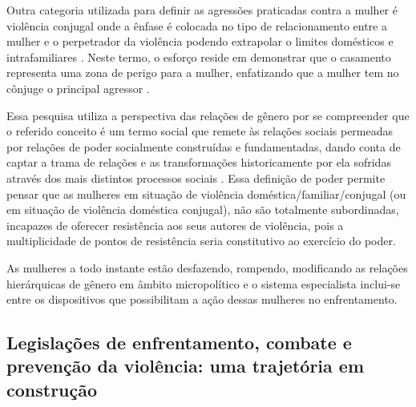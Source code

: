\documentclass[12pt]{article}
\begin{document}
Outra categoria utilizada para definir as agressões praticadas contra a mulher é violência conjugal  onde a ênfase é colocada no tipo de relacionamento entre a mulher e o perpetrador da violência podendo extrapolar o limites domésticos e intrafamiliares \cite{stuker2016}. Neste termo, o esforço reside em demonstrar que o casamento representa uma zona de perigo para a mulher, enfatizando que a mulher tem no cônjuge o principal agressor \cite{Izumino2003}.

Essa pesquisa utiliza a perspectiva das relações de gênero por se compreender que o referido conceito é um termo social que remete às relações sociais permeadas por relações de poder socialmente construídas e fundamentadas, dando conta de captar a trama de relações e as transformações historicamente por ela sofridas através dos mais distintos processos sociais \cite{SAFFIOTI1992}. Essa definição de poder permite pensar que as mulheres em situação de violência doméstica/familiar/conjugal (ou em situação de violência doméstica conjugal), não são totalmente subordinadas, incapazes de oferecer resistência aos seus autores de violência, pois a multiplicidade de pontos de resistência seria constitutivo ao exercício do poder. 

As mulheres a todo instante estão desfazendo, rompendo, modificando as relações hierárquicas de gênero em âmbito micropolítico e o sistema especialista inclui-se entre os dispositivos que possibilitam a ação dessas mulheres no enfrentamento.

\subsection{Legislações de enfrentamento, combate e prevenção da violência: uma trajetória em construção} \label{Legislacoes}
\end{document}
